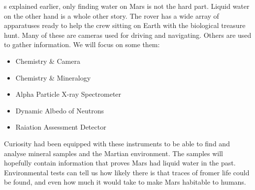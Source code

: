 s explained earlier, only finding water on Mars is not the hard part.
Liquid water on the other hand is a whole other story.
The rover has a wide array of apparatuses ready to help the crew sitting on Earth with the biological treasure hunt.
Many of these are cameras used for driving and navigating.
Others are used to gather information.
We will focus on some them:

\begin{itemize}
\item Chemistry \& Camera
\item Chemistry \& Mineralogy
\item Alpha Particle X-ray Spectrometer
\item Dynamic Albedo of Neutrons
\item Raiation Assessment Detector
\end{itemize}

Curiosity had been equipped with these instruments to be able to find and analyse mineral samples and the Martian environment.
The samples will hopefully contain information that proves Mars had liquid water in the past.
Environmental tests can tell us how likely there is that traces of fromer life could be found, and even how much it would take to make Mars habitable to humans.